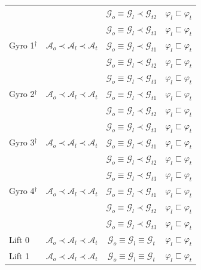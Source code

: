\begin{table}[h]
\begin{tabular*}{\linewidth}{@{\extracolsep{\fill}}lccc@{}}
 & & $\mathcal{G}_{o}\equiv\mathcal{G}_{l}\prec\mathcal{G}_{t2}$ & $\varphi_l\sqsubset \varphi_t$ \\
 & & $\mathcal{G}_{o}\equiv\mathcal{G}_{l}\prec\mathcal{G}_{t3}$ & $\varphi_l\sqsubset \varphi_t$ \\
Gyro 1$^\dagger$ & $\mathcal{A}_{o}\prec\mathcal{A}_{l}\prec\mathcal{A}_{t}$ & $\mathcal{G}_{o}\equiv\mathcal{G}_{l}\prec\mathcal{G}_{t1}$ & $\varphi_l\sqsubset \varphi_t$ \\
 & & $\mathcal{G}_{o}\equiv\mathcal{G}_{l}\prec\mathcal{G}_{t2}$ & $\varphi_l\sqsubset \varphi_t$ \\
 & & $\mathcal{G}_{o}\equiv\mathcal{G}_{l}\prec\mathcal{G}_{t3}$ & $\varphi_l\sqsubset \varphi_t$ \\
Gyro 2$^\dagger$ & $\mathcal{A}_{o}\prec\mathcal{A}_{l}\prec\mathcal{A}_{t}$ & $\mathcal{G}_{o}\equiv\mathcal{G}_{l}\prec\mathcal{G}_{t1}$ & $\varphi_l\sqsubset \varphi_t$ \\
 & & $\mathcal{G}_{o}\equiv\mathcal{G}_{l}\prec\mathcal{G}_{t2}$ & $\varphi_l\sqsubset \varphi_t$ \\
 & & $\mathcal{G}_{o}\equiv\mathcal{G}_{l}\prec\mathcal{G}_{t3}$ & $\varphi_l\sqsubset \varphi_t$ \\
Gyro 3$^\dagger$ & $\mathcal{A}_{o}\prec\mathcal{A}_{l}\prec\mathcal{A}_{t}$ & $\mathcal{G}_{o}\equiv\mathcal{G}_{l}\prec\mathcal{G}_{t1}$ & $\varphi_l\sqsubset \varphi_t$ \\
 & & $\mathcal{G}_{o}\equiv\mathcal{G}_{l}\prec\mathcal{G}_{t2}$ & $\varphi_l\sqsubset \varphi_t$ \\
 & & $\mathcal{G}_{o}\equiv\mathcal{G}_{l}\prec\mathcal{G}_{t3}$ & $\varphi_l\sqsubset \varphi_t$ \\
Gyro 4$^\dagger$ & $\mathcal{A}_{o}\prec\mathcal{A}_{l}\prec\mathcal{A}_{t}$ & $\mathcal{G}_{o}\equiv\mathcal{G}_{l}\prec\mathcal{G}_{t1}$ & $\varphi_l\sqsubset \varphi_t$ \\
 & & $\mathcal{G}_{o}\equiv\mathcal{G}_{l}\prec\mathcal{G}_{t2}$ & $\varphi_l\sqsubset \varphi_t$ \\
 & & $\mathcal{G}_{o}\equiv\mathcal{G}_{l}\prec\mathcal{G}_{t3}$ & $\varphi_l\sqsubset \varphi_t$ \\
\hline
Lift 0 & $\mathcal{A}_{o}\prec\mathcal{A}_{l}\prec\mathcal{A}_{t}$ & $\mathcal{G}_{o}\equiv\mathcal{G}_{l}\equiv\mathcal{G}_{t}$ & $\varphi_l\sqsubset \varphi_t$ \\
Lift 1 & $\mathcal{A}_{o}\prec\mathcal{A}_{l}\prec\mathcal{A}_{t}$ & $\mathcal{G}_{o}\equiv\mathcal{G}_{l}\equiv\mathcal{G}_{t}$ & $\varphi_l\sqsubset \varphi_t$ \\

\end{tabular*}
\end{table}
